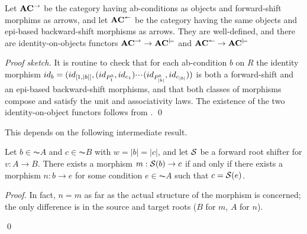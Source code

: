\begin{theorem}
Let $\mathbf{AC}^{\to}$ be the category having ab-conditions as objects and forward-shift morphims as arrows, and let $\mathbf{AC}^{\twoheadleftarrow}$ be the category having the same objects and epi-based backward-shift morphisms as arrows. They are well-defined, and there are identity-on-objects functors $\mathbf{AC}^{\to} \to \mathbf{AC}^{\models}$ and $\mathbf{AC}^{\twoheadleftarrow} \to \mathbf{AC}^{\models}$
\end{theorem}
\emph{Proof sketch.}
It is routine to check that for each ab-condition $b$ on $R$ the identity morphism $id_b = (id_{[1,|b|]},(id_{P^b_1},id_{c_1}){\cdotp\mkern-2mu\cdotp\mkern-2mu\cdotp\mkern1mu} (id_{P^b_{|b|}},id_{c_{|b|}}))$ is both a forward-shift and an epi-based backward-shift morphisms, and that both classes of morphisms compose and satisfy the unit and associativity laws. The existence of the two identity-on-object functors follows from .
\qed 


This depends on the following intermediate result.

\begin{lemma}
Let $b\in \AC A$ and $c\in \AC B$ with $w=|b|=|c|$, and let $\mathcal{S}$ be a forward root shifter for $v:A\to B$. There exists a morphism $m:\mathcal{S}(b)\to c$ if and only if there exists a morphism $n:b\to e$ for some condition $e\in \AC A$ such that $c=\mathcal{S}(e)$.
\end{lemma}
%
\begin{proof}
In fact, $n=m$ as far as the actual structure of the morphism is concerned; the only difference is in the source and target roots ($B$ for $m$, $A$ for $n$).

\qed
\end{proof}

